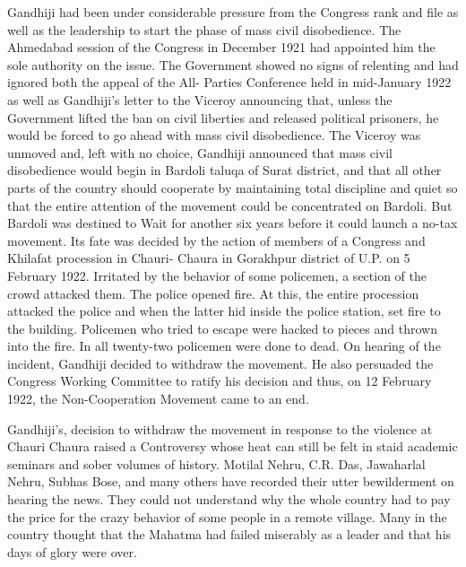 Gandhiji had been under considerable pressure from the Congress rank and file as well as the leadership to start the phase of mass civil disobedience. The Ahmedabad session of the Congress in December 1921 had appointed him the sole authority on the issue. The Government showed no signs of relenting and had ignored both the appeal of the All- Parties Conference held in mid-January 1922 as well as Gandhiji’s letter to the Viceroy announcing that, unless the Government lifted the ban on civil liberties and released political prisoners, he would be forced to go ahead with mass civil disobedience. The Viceroy was unmoved and, left with no choice, Gandhiji announced that mass civil disobedience would begin in Bardoli taluqa of Surat district, and that all other parts of the country should cooperate by maintaining total discipline and quiet so that the entire attention of the movement could be concentrated on Bardoli. But Bardoli was destined to Wait for another six years before it could launch a no-tax movement. Its fate was decided by the action of members of a Congress and Khilafat procession in Chauri- Chaura in Gorakhpur district of U.P. on 5 February 1922. Irritated by the behavior of some policemen, a section of the crowd attacked them. The police opened fire. At this, the entire procession attacked the police and when the latter hid inside the police station, set fire to the building. Policemen who tried to escape were hacked to pieces and thrown into the fire. In all twenty-two policemen were done to dead. On hearing of the incident, Gandhiji decided to withdraw the movement. He also persuaded the Congress Working Committee to ratify his decision and thus, on 12 February 1922, the Non-Cooperation Movement came to an end. 

Gandhiji’s, decision to withdraw the movement in response to the violence at Chauri Chaura raised a Controversy whose heat can still be felt in staid academic seminars and sober volumes of history. Motilal Nehru, C.R. Das, Jawaharlal Nehru, Subhas Bose, and many others have recorded their utter bewilderment on hearing the news. They could not understand why the whole country had to pay the price for the crazy behavior of some people in a remote village. Many in the country thought that the Mahatma had failed miserably as a leader and that his days of glory were over. 

